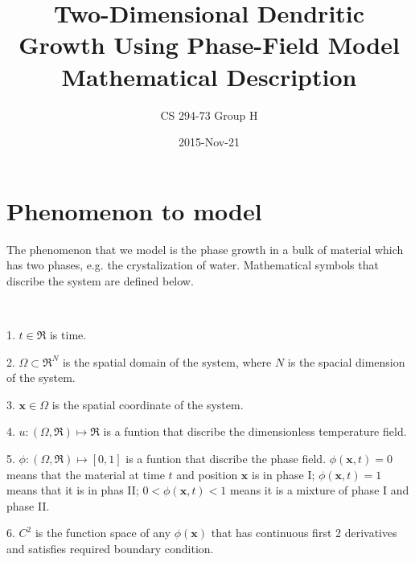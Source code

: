 \documentclass{article}
\title{Two-Dimensional Dendritic Growth Using Phase-Field Model \\ Mathematical Description}
\date{2015-Nov-21}
\author{CS 294-73 Group H}
\begin{document}
    \maketitle
    \section{Phenomenon to model}
        The phenomenon that we model is the phase growth in a bulk of material which has two phases, e.g. the crystalization of water. Mathematical symbols that discribe the system are defined below.
        \par \ 
        \par 1. $t\in\Re$ is time.
        \par 2. $\Omega\subset\Re^N$ is the spatial domain of the system, where $N$ is the spacial dimension of the system.
        \par 3. $\bm{x}\in\Omega$ is the spatial coordinate of the system.
        \par 4. $u:(\Omega,\Re)\mapsto\Re$ is a funtion that discribe the dimensionless temperature field.
        \par 5. $\phi:(\Omega,\Re)\mapsto[0,1]$ is a funtion that discribe the phase field. $\phi(\bm{x},t)=0$ means that the material at time $t$ and position $\bm{x}$ is in phase I; $\phi(\bm{x},t)=1$ means that it is in phas II; $0<\phi(\bm{x},t)<1$ means it is a mixture of phase I and phase II.
        \par 6. $C^2$ is the function space of any $\phi(\bm{x})$ that has continuous first 2 derivatives and satisfies required boundary condition.
        
\end{document}
